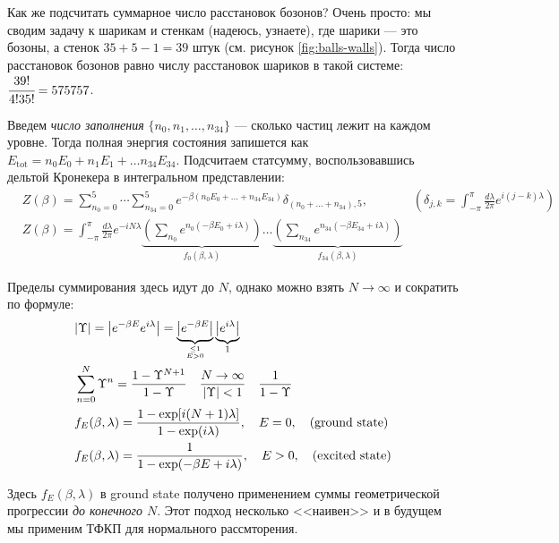 Как же подсчитать суммарное число расстановок бозонов?
Очень просто: мы сводим задачу к шарикам и стенкам (надеюсь, узнаете), где шарики --- это бозоны, а стенок $35+5-1=39$ штук (см. рисунок \ref{fig:balls-walls}).
Тогда число расстановок бозонов равно числу расстановок шариков в такой системе: $\cfrac{39!}{4!35!} = 575757$.

Введем \textit{число заполнения} $\{n_0, n_1, \dots, n_{34}\}$ --- сколько частиц лежит на каждом уровне.
Тогда полная энергия состояния запишется как $E_{\text{tot}} = n_0 E_0 + n_1 E_1 + \dots n_{34} E_{34}$.
Подсчитаем статсумму, воспользовавшись дельтой Кронекера в интегральном представлении:
\begin{align}
    \label{eq:Z-5_particles-via-delta}
    & Z(\beta)=\sum_{n_{0}=0}^{5} \cdots \sum_{n_{34}=0}^{5} e^{-\beta\left(n_{0} E_{0}+\ldots+n_{34} E_{34}\right)} \delta_{\left(n_{0}+\ldots+n_{34}\right), 5}, 
    & \left(\delta_{j, k}=\int_{-\pi}^{\pi} \frac{d \lambda}{2 \pi} e^{i(j-k) \lambda}\right) \\
    & Z(\beta)=\int_{-\pi}^{\pi} \frac{d \lambda}{2 \pi} e^{-i N \lambda} \underbrace{\left(\sum_{n_{0}} e^{n_{0}\left(-\beta E_{0}+i \lambda\right)}\right)}_{f_{0}(\beta, \lambda)} \ldots \underbrace{\left(\sum_{n_{34}} e^{n_{34}\left(-\beta E_{34}+i \lambda\right)}\right)}_{f_{34}(\beta, \lambda)} &
\end{align}

Пределы суммирования здесь идут до $N$, однако можно взять $N\rightarrow \infty$ и сократить по формуле:
\begin{align}
    \label{eq:upsilon-geometrical}
    & |\Upsilon|=\left|e^{-\beta E} e^{i \lambda}\right|=\underbrace{\left|e^{-\beta E}\right|}_{\leq 1 \atop E>0} \underbrace{\left|e^{i \lambda}\right|}_{1} \\
    \nonumber
    & \sum_{n=0}^{N} \Upsilon^{n}=\frac{1-\Upsilon^{N+1}}{1-\Upsilon} \quad \frac{N \rightarrow \infty}{|\Upsilon|<1} \quad \frac{1}{1-\Upsilon} \\
    \nonumber
    & f_{E}(\beta, \lambda) =\frac{1-\exp [i(N+1) \lambda]}{1-\exp (i \lambda)}, \quad E=0, \quad \text {(ground state)}\\
    \nonumber
    & f_{E}(\beta, \lambda) =\frac{1}{1-\exp (-\beta E+i \lambda)}, \quad E>0, \quad(\text {excited state})
\end{align}

Здесь $f_E (\beta, \lambda)$ в ground state получено применением суммы геометрической прогрессии \textit{до конечного $N$}.
Этот подход несколько <<наивен>> и в будущем мы применим ТФКП для нормального рассмторения.

